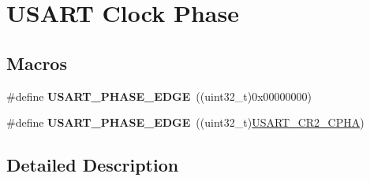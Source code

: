 \hypertarget{group___u_s_a_r_t___clock___phase}{}\section{U\+S\+A\+RT Clock Phase}
\label{group___u_s_a_r_t___clock___phase}
\subsection*{Macros}
\begin{DoxyCompactItemize}
\item 
\#define {\bfseries U\+S\+A\+R\+T\+\_\+\+P\+H\+A\+S\+E\+\_\+E\+D\+GE}~((uint32\+\_\+t)0x00000000)\hypertarget{group___u_s_a_r_t___clock___phase_gab050873df3eb3844f973e61681e02e6a}{}\label{group___u_s_a_r_t___clock___phase_gab050873df3eb3844f973e61681e02e6a}

\item 
\#define {\bfseries U\+S\+A\+R\+T\+\_\+\+P\+H\+A\+S\+E\+\_\+E\+D\+GE}~((uint32\+\_\+t)\hyperlink{group___peripheral___registers___bits___definition_ga362976ce813e58310399d113d2cf09cb}{U\+S\+A\+R\+T\+\_\+\+C\+R2\+\_\+\+C\+P\+HA})\hypertarget{group___u_s_a_r_t___clock___phase_ga080cff411c6cefbb511162fcc91c43ec}{}\label{group___u_s_a_r_t___clock___phase_ga080cff411c6cefbb511162fcc91c43ec}

\end{DoxyCompactItemize}


\subsection{Detailed Description}

